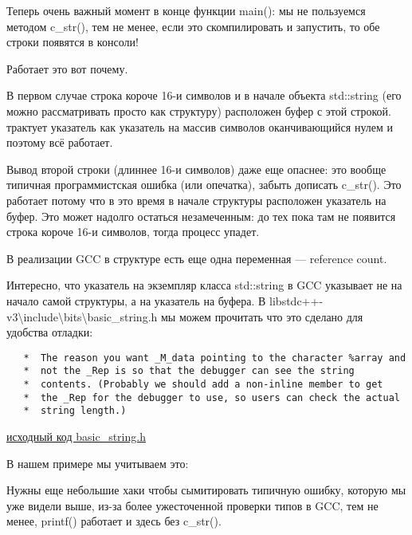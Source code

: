 Теперь очень важный момент в конце функции main(): мы не пользуемся методом c\_str(), тем не менее,
если это скомпилировать и запустить, то обе строки появятся в консоли!

Работает это вот почему.

В первом случае строка короче 16-и символов и в начале объекта std::string (его можно рассматривать
просто как структуру) расположен буфер с этой строкой.
\printf трактует указатель как указатель на массив символов оканчивающийся нулем и поэтому всё работает.

Вывод второй строки (длиннее 16-и символов) даже еще опаснее: это вообще типичная программистская ошибка 
(или опечатка), забыть дописать c\_str().
Это работает потому что в это время в начале структуры расположен указатель на буфер.
Это может надолго остаться незамеченным: до тех пока там не появится строка 
короче 16-и символов, тогда процесс упадет.


В реализации GCC в структуре есть еще одна переменная --- reference count.

Интересно, что указатель на экземпляр класса std::string в GCC указывает не на начало самой структуры, 
а на указатель на буфера.
В libstdc++-v3\textbackslash{}include\textbackslash{}bits\textbackslash{}basic\_string.h 
мы можем прочитать что это сделано для удобства отладки:

\begin{lstlisting}
   *  The reason you want _M_data pointing to the character %array and
   *  not the _Rep is so that the debugger can see the string
   *  contents. (Probably we should add a non-inline member to get
   *  the _Rep for the debugger to use, so users can check the actual
   *  string length.)
\end{lstlisting}

\href{http://go.yurichev.com/17085}{исходный код basic\_string.h}

В нашем примере мы учитываем это:



Нужны еще небольшие хаки чтобы сымитировать типичную ошибку, которую мы уже видели выше, из-за
более ужесточенной проверки типов в GCC, тем не менее, printf() работает и здесь без c\_str().




